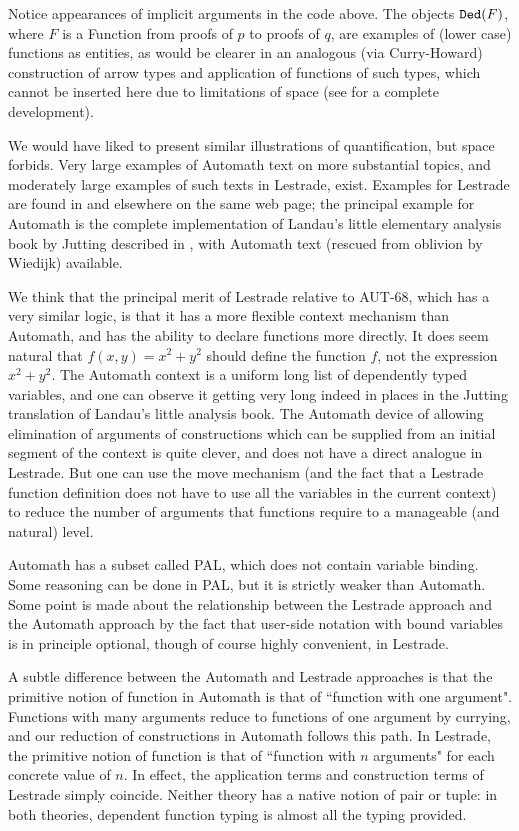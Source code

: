 \documentclass{article}
\begin{document}
  Notice appearances of implicit arguments in the code above.  The objects
${\tt Ded}(F)$, where $F$ is a Function from proofs of $p$ to proofs of $q$, are examples of (lower case) functions as entities, as would be clearer in an analogous (via Curry-Howard) construction of arrow types and application of functions of such types, which cannot be inserted here due to limitations of space (see \cite{lestrademanual} for a complete development).

We would have liked to present similar illustrations of quantification, but space forbids.  Very large examples of Automath text on more substantial topics, and moderately large examples of such texts in Lestrade, exist.  Examples for Lestrade are found in \cite{lestrademanual} and elsewhere on the same web page;  the principal example for Automath is the complete implementation of Landau's little elementary analysis book \cite{landau} by Jutting described in \cite{juttingd}, with Automath text \cite{grundlagen} (rescued from oblivion by Wiedijk) available.

We think that the principal merit of Lestrade relative to AUT-68, which has a very similar logic, is that it has a more flexible context mechanism than Automath, and has the ability to declare functions more directly.  It does seem natural that $f(x,y)=x^2+y^2$ should define the function $f$, not the expression $x^2+y^2$.   The Automath context is a uniform long list of dependently typed variables, and one can observe it getting very long indeed in places in the Jutting translation of Landau's little analysis book.  The Automath device of allowing elimination of arguments of constructions which can be supplied from an initial segment of the context is quite clever, and does not have a direct analogue in Lestrade.  But one can use the move mechanism (and the fact that a Lestrade function definition does not have to use all the variables in the current context)  to reduce the number of arguments that functions require to a manageable (and natural) level.

Automath has a subset called PAL, which does not contain variable binding.  Some reasoning can be done in PAL, but it is strictly weaker than Automath.
Some point is made about the relationship between the Lestrade approach and the Automath approach by the fact that user-side notation with bound variables is in principle optional, though of course highly convenient, in Lestrade.

A subtle difference between the Automath and Lestrade approaches is that the primitive notion of function in Automath is that of ``function with one argument".  Functions with many arguments reduce to functions of one argument by currying, and our reduction of constructions in Automath follows this path.  In Lestrade, the primitive notion of function is that of ``function with $n$ arguments" for each concrete value of $n$.  In effect, the application terms and construction terms of Lestrade simply coincide.  Neither theory has a native notion
of pair or tuple:  in both theories, dependent function typing is almost all the typing provided.
\end{document}

